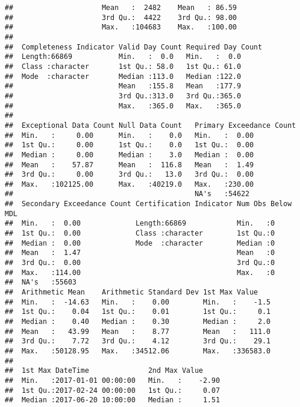 \documentclass[]{article}
\begin{document}
\begin{verbatim}
##                     Mean   :  2482    Mean   : 86.59     
##                     3rd Qu.:  4422    3rd Qu.: 98.00     
##                     Max.   :104683    Max.   :100.00     
##                                                          
##  Completeness Indicator Valid Day Count Required Day Count
##  Length:66869           Min.   :  0.0   Min.   :  0.0     
##  Class :character       1st Qu.: 58.0   1st Qu.: 61.0     
##  Mode  :character       Median :113.0   Median :122.0     
##                         Mean   :155.8   Mean   :177.9     
##                         3rd Qu.:313.0   3rd Qu.:365.0     
##                         Max.   :365.0   Max.   :365.0     
##                                                           
##  Exceptional Data Count Null Data Count   Primary Exceedance Count
##  Min.   :     0.00      Min.   :    0.0   Min.   :  0.00          
##  1st Qu.:     0.00      1st Qu.:    0.0   1st Qu.:  0.00          
##  Median :     0.00      Median :    3.0   Median :  0.00          
##  Mean   :    57.87      Mean   :  116.8   Mean   :  1.49          
##  3rd Qu.:     0.00      3rd Qu.:   13.0   3rd Qu.:  0.00          
##  Max.   :102125.00      Max.   :40219.0   Max.   :230.00          
##                                           NA's   :54622           
##  Secondary Exceedance Count Certification Indicator Num Obs Below MDL
##  Min.   :  0.00             Length:66869            Min.   :0        
##  1st Qu.:  0.00             Class :character        1st Qu.:0        
##  Median :  0.00             Mode  :character        Median :0        
##  Mean   :  1.47                                     Mean   :0        
##  3rd Qu.:  0.00                                     3rd Qu.:0        
##  Max.   :114.00                                     Max.   :0        
##  NA's   :55603                                                       
##  Arithmetic Mean    Arithmetic Standard Dev 1st Max Value     
##  Min.   :  -14.63   Min.   :    0.00        Min.   :    -1.5  
##  1st Qu.:    0.04   1st Qu.:    0.01        1st Qu.:     0.1  
##  Median :    0.40   Median :    0.30        Median :     2.0  
##  Mean   :   43.99   Mean   :    8.77        Mean   :   111.0  
##  3rd Qu.:    7.72   3rd Qu.:    4.12        3rd Qu.:    29.1  
##  Max.   :50128.95   Max.   :34512.06        Max.   :336583.0  
##                                                               
##  1st Max DateTime              2nd Max Value      
##  Min.   :2017-01-01 00:00:00   Min.   :    -2.90  
##  1st Qu.:2017-02-24 00:00:00   1st Qu.:     0.07  
##  Median :2017-06-20 10:00:00   Median :     1.51  

\end{verbatim}
\end{document}

